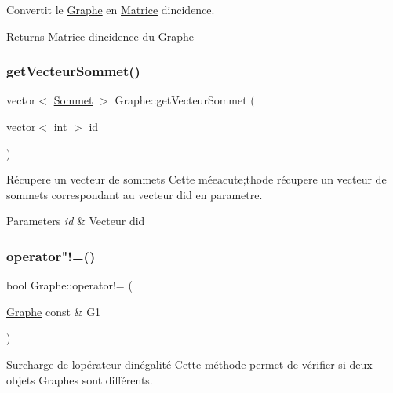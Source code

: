 Convertit le \hyperlink{classGraphe}{Graphe} en \hyperlink{classMatrice}{Matrice} d\textquotesingle{}incidence. 

\begin{DoxyReturn}{Returns}
\hyperlink{classMatrice}{Matrice} d\textquotesingle{}incidence du \hyperlink{classGraphe}{Graphe} 
\end{DoxyReturn}
\mbox{\label{classGraphe_adabde97f8f099447c50bfb050e215c01}} 
\subsubsection{\texorpdfstring{get\+Vecteur\+Sommet()}{getVecteurSommet()}}
{\footnotesize\ttfamily vector$<$ \hyperlink{classSommet}{Sommet} $>$ Graphe\+::get\+Vecteur\+Sommet (\begin{DoxyParamCaption}\item[{vector$<$ int $>$}]{id }\end{DoxyParamCaption})}



R\'{e}cupere un vecteur de sommets Cette méeacute;thode r\'{e}cupere un vecteur de sommets correspondant au vecteur d\textquotesingle{}id en parametre. 


\begin{DoxyParams}{Parameters}
{\em id} & Vecteur d\textquotesingle{}id \\
\hline
\end{DoxyParams}
\mbox{\label{classGraphe_ae75822e0de166927c13e63bd8e738491}} 
\subsubsection{\texorpdfstring{operator"!=()}{operator!=()}}
{\footnotesize\ttfamily bool Graphe\+::operator!= (\begin{DoxyParamCaption}\item[{\hyperlink{classGraphe}{Graphe} const \&}]{G1 }\end{DoxyParamCaption})}



Surcharge de l\textquotesingle{}op\'{e}rateur d\textquotesingle{}in\'{e}galit\'{e} Cette m\'{e}thode permet de v\'{e}rifier si deux objets Graphes sont diff\'{e}rents. 

